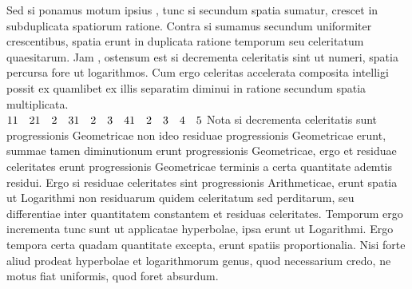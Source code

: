 \pend
\pstart
Sed si ponamus motum ipsius ,
tunc si secundum spatia sumatur, crescet in subduplicata spatiorum ratione. Contra si sumamus secundum 
uniformiter crescentibus, spatia erunt in duplicata ratione temporum seu celeritatum quaesitarum. Jam ,
ostensum est 
si decrementa celeritatis sint ut numeri, spatia percursa fore ut logarithmos. Cum ergo celeritas accelerata composita intelligi possit ex 
quamlibet ex illis separatim diminui in ratione secundum spatia multiplicata.\\
$\displaystyle 1\\
1 \quad 2\\
1 \quad 2 \quad 3\\
1 \quad 2 \quad 3 \quad 4\\
1 \quad 2 \quad 3 \quad 4 \quad 5$
\pend
\count{}
\pstart
Nota si decrementa celeritatis sunt progressionis Geometricae non ideo residuae progressionis Geometricae erunt, summae tamen diminutionum erunt progressionis Geometricae, ergo et residuae celeritates erunt progressionis Geometricae terminis a certa quantitate ademtis residui. Ergo si residuae celeritates sint progressionis Arithmeticae, 
%
%
erunt spatia ut Logarithmi non residuarum quidem celeritatum sed perditarum, seu differentiae inter quantitatem constantem et residuas celeritates. Temporum ergo incrementa tunc sunt ut applicatae hyperbolae, 
ipsa erunt ut Logarithmi. Ergo tempora certa quadam quantitate excepta, erunt spatiis proportionalia. Nisi forte aliud prodeat hyperbolae et logarithmorum genus, quod necessarium credo, ne motus fiat uniformis, quod foret absurdum.
\pend